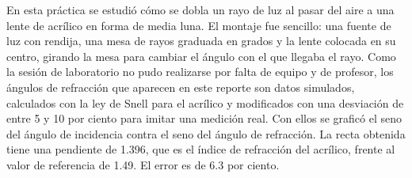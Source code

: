 En esta práctica se estudió cómo se dobla un rayo de luz al pasar del aire a una lente de acrílico en forma de media luna. El montaje fue sencillo: una fuente de luz con rendija, una mesa de rayos graduada en grados y la lente colocada en su centro, girando la mesa para cambiar el ángulo con el que llegaba el rayo. Como la sesión de laboratorio no pudo realizarse por falta de equipo y de profesor, los ángulos de refracción que aparecen en este reporte son datos simulados, calculados con la ley de Snell para el acrílico y modificados con una desviación de entre 5 y 10 por ciento para imitar una medición real. Con ellos se graficó el seno del ángulo de incidencia contra el seno del ángulo de refracción. La recta obtenida tiene una pendiente de 1.396, que es el índice de refracción del acrílico, frente al valor de referencia de 1.49. El error es de 6.3 por ciento.
